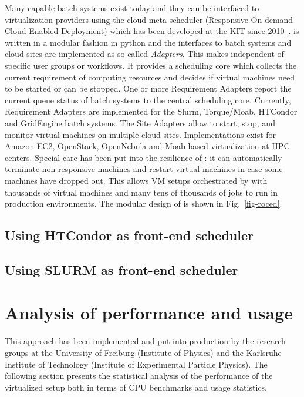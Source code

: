 Many capable batch systems exist today and they can be interfaced to virtualization providers using the cloud meta-scheduler \Roced (Responsive On-demand Cloud Enabled Deployment) which has been developed at the KIT since 2010~\cite{ROCED}. \Roced is written in a modular
fashion in python and the interfaces to batch systems and cloud sites
are implemented as so-called \textit{Adapters}. This makes \Roced
independent of specific user groups or workflows. It provides a
scheduling core which collects the current requirement of computing
resources and decides if virtual machines need to be started or can be
stopped. One or more Requirement Adapters report the current queue
status of batch systems to the central scheduling core. Currently,
Requirement Adapters are implemented for the Slurm, Torque/Moab, HTCondor
and GridEngine batch systems. The Site Adapters allow \Roced to start,
stop, and monitor virtual machines on multiple cloud
sites. Implementations exist for Amazon EC2, OpenStack, OpenNebula and
Moab-based virtualization at HPC centers. Special care has been put
into the resilience of \Roced: it can automatically terminate
non-responsive machines and restart virtual machines in case some
machines have dropped out. This allows VM setups orchestrated by \Roced with thousands of virtual machines and many tens of thousands of jobs to run in production environments.
The modular design of \Roced is shown in Fig.~\ref{fig-roced}.

\subsection{Using HTCondor as front-end scheduler}\label{sec:ROCED:HTCondor}


\subsection{Using SLURM as front-end scheduler}



\section{Analysis of performance and usage}

This approach has been implemented and put into production by the research groups at the University of Freiburg (Institute of Physics) and the Karlsruhe Institute of Technology (Institute of Experimental
Particle Physics). The following section presents the statistical analysis of the performance of the virtualized setup both in terms of CPU benchmarks and usage statistics.

